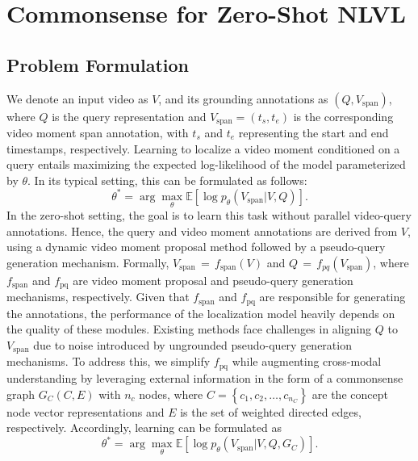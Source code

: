 \section{Commonsense for Zero-Shot NLVL}
\label{sec:proposedSection}

\subsection{Problem Formulation}
We denote an input video as $V$, and its grounding annotations as \(\left( Q,V_{\text{span}}\right) \), where $Q$ is the query representation and \(V_{\text{span}}\!=\!\left( t_{s},t_{e}\right)\) is the corresponding video moment span annotation, with \(t_{s}\) and \(t_{e}\) representing the start and end timestamps, respectively. Learning to localize a video moment conditioned on a query entails maximizing the expected log-likelihood of the model parameterized by \(\theta\). In its typical setting, this can be formulated as follows:
\begin{equation}
\label{eq:groundingOriginal}
    \theta ^{\ast }=\arg \max _{\theta } \mathbb{E}\left[ \log p_{\theta }\left(  V_{\text{span}} | V,Q\right) \right]. 
\end{equation}
In the zero-shot setting, the goal is to learn this task without parallel video-query annotations. Hence, the query and video moment annotations are derived from $V$, using a dynamic video moment proposal method followed by a pseudo-query generation mechanism. Formally,  \(V_{\text{span}}\,\!{=}\!\,f_{\text{span}}(V)\) and \(Q\,\!{=}\!\,f_{pq}(V_{\text{span}})\), where $f_{\text{span}}$ and $f_{\text{pq}}$ are video moment proposal and pseudo-query generation mechanisms, respectively. Given that $f_{\text{span}}$ and $f_{\text{pq}}$ are responsible for generating the annotations, the performance of the localization model heavily depends on the quality of these modules. Existing methods face challenges in aligning \(Q\) to \(V_{\text{span}}\) due to noise introduced by ungrounded pseudo-query generation mechanisms. 
To address this, we simplify \(f_{\text{pq}}\) while augmenting cross-modal understanding by leveraging external information in the form of a commonsense graph \(G_{C}(C, E)\) with \(n_c\) nodes, where \(C\!=\!\left\{c_{1}, c_{2}, \dots, c_{n_{C}}\right\}\) are the concept node vector representations and \(E\) is the set of weighted directed edges, respectively. Accordingly, learning can be formulated as
\begin{equation}
\label{eq:groundingOurs}
    \theta ^{\ast }=\arg \max _{\theta } \mathbb{E}\left[ \log p_{\theta }\left(  V_{\text{span}}| V,Q,G_{C}\right) \right].
\end{equation}

